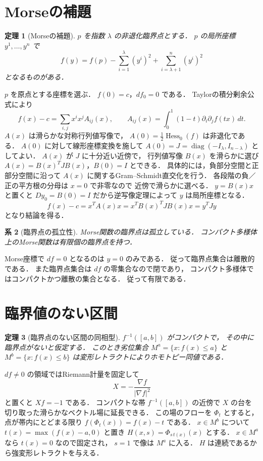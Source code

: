 \documentclass[a5paper,10pt,onecolumn]{jsarticle}
\makeatletter
\theoremstyle{mathnotetheorem}
\newtheorem{theorem}{定理}[section]
\newtheorem{corollary}[theorem]{系}
\renewcommand{\proofname}{証明}
\renewenvironment{proof}[1][\proofname]{%
  \par\pushQED{\qed}\normalfont\topsep4\p@\@plus2\p@\relax
  \trivlist\item[\hskip\labelsep\bfseries #1]\ignorespaces
}{\popQED\endtrivlist\@endpefalse}
\makeatother
\begin{document}
\section{Morseの補題}
\begin{theorem}[Morseの補題]\label{thm:morselemma}
$p$ を指数 $\lambda$ の非退化臨界点とする．
$p$ の局所座標 $y^1,\dots,y^n$ で
\[
 f(y)=f(p)-\sum_{i=1}^{\lambda}(y^i)^2
 +\sum_{i=\lambda+1}^n(y^i)^2
\]
となるものがある．
\end{theorem}
\begin{proof}
$p$ を原点とする座標を選ぶ．
$f(0)=c$，$df_0=0$ である．
Taylorの積分剰余公式により
\[
 f(x)-c=\sum_{i,j}x^ix^jA_{ij}(x),\qquad
 A_{ij}(x)=\int_0^1(1-t)\partial_i\partial_jf(tx)\,dt.
\]
$A(x)$ は滑らかな対称行列値写像で，
$A(0)=\tfrac12\operatorname{Hess}_0(f)$ は非退化である．
$A(0)$ に対して線形座標変換を施して
$A(0)=J=\operatorname{diag}(-I_\lambda,I_{n-\lambda})$
としてよい．
$A(x)$ が $J$ に十分近い近傍で，
行列値写像 $B(x)$ を滑らかに選び
$A(x)=B(x)^T J B(x)$，$B(0)=I$ とできる．
具体的には，負部分空間と正部分空間に沿って
$A(x)$ に関するGram--Schmidt直交化を行う．
各段階の負／正の平方根の分母は $x=0$ で非零なので
近傍で滑らかに選べる．
$y=B(x)x$ と置くと
$Dy_0=B(0)=I$ だから逆写像定理によって
$y$ は局所座標となる．
\[
 f(x)-c=x^TA(x)x
 =x^TB(x)^TJB(x)x=y^TJy
\]
となり結論を得る．
\end{proof}
\begin{corollary}[臨界点の孤立性]
Morse関数の臨界点は孤立している．
コンパクト多様体上のMorse関数は有限個の臨界点を持つ．
\end{corollary}
\begin{proof}
Morse座標で $df=0$ となるのは $y=0$ のみである．
従って臨界点集合は離散的である．
また臨界点集合は $df$ の零集合なので閉であり，
コンパクト多様体ではコンパクトかつ離散の集合となる．
従って有限である．
\end{proof}
\section{臨界値のない区間}
\begin{theorem}[臨界点のない区間の同相型]\label{thm:regular}
$f^{-1}([a,b])$ がコンパクトで，
その中に臨界点がないと仮定する．
このとき劣位集合
$M^a=\{x:f(x)\le a\}$ と
$M^b=\{x:f(x)\le b\}$
は変形レトラクトによりホモトピー同値である．
\end{theorem}
\begin{proof}
$df\ne0$ の領域ではRiemann計量を固定して
\[
 X=-\frac{\nabla f}{|\nabla f|^2}
\]
と置くと $Xf=-1$ である．
コンパクトな帯 $f^{-1}([a,b])$ の近傍で
$X$ の台を切り取った滑らかなベクトル場に延長できる．
この場のフローを $\Phi_t$ とすると，
点が帯内にとどまる限り
$f(\Phi_t(x))=f(x)-t$ である．
$x\in M^b$ について
$t(x)=\max(f(x)-a,0)$ と置き
$H(x,s)=\Phi_{s\,t(x)}(x)$ とする．
$x\in M^a$ なら $t(x)=0$ なので固定され，
$s=1$ で像は $M^a$ に入る．
$H$ は連続であるから強変形レトラクトを与える．
\end{proof}
\end{document}
